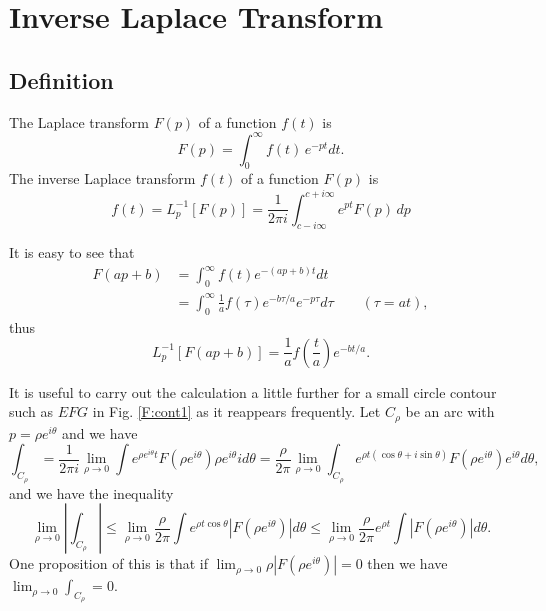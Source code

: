 
\chapter{Inverse Laplace Transform}

\section{Definition}
The Laplace transform $F(p)$ of a function $f(t)$ is
\begin{equation}
  F(p) = \int_0^{\infty} f(t)\, e^{-pt} dt.
\end{equation}
The inverse Laplace transform $f(t)$ of a function $F(p)$ is
\begin{equation}
	f(t) = L_p^{-1} [ F(p) ] 
       = \frac{1}{2\pi i}   
           \int_{c-i\infty}^{c+i\infty} e^{p t} F(p)\, dp
\end{equation}

It is easy to see that
\begin{align*}
	F(a p+b) 
	&= \int_0^{\infty} f(t) e^{-(a p+b)t} dt  \\
	&= \int_0^{\infty} \frac{1}{a} f\left(\tau\right) e^{-b\tau /a} 
	     e^{-p\tau} d\tau  \qquad (\tau=a t),
\end{align*}
thus
\begin{equation} \label{E:ilt_lin}
	L_p^{-1} [ F(a p + b) ] = \frac{1}{a} f(\frac{t}{a}) e^{-b t/a}.
\end{equation}

It is useful to carry out the calculation a little further for a small circle
contour such as $EFG$ in Fig. \ref{F:cont1} as it reappears frequently. Let
$C_{\rho}$ be an arc with $p=\rho e^{i\theta}$ and we have
\[
  \int_{C_{\rho}}  
    = \frac{1}{2\pi i} \lim_{\rho\to 0} 
      \int e^{\rho e^{i\theta} t} F(\rho e^{i\theta})
        \rho e^{i\theta} i d\theta
    = \frac{\rho}{2\pi} \lim_{\rho\to 0} 
      \int_{C_{\rho}} e^{\rho t (\cos\theta+i\sin\theta)} F(\rho e^{i\theta})
         e^{i\theta} d\theta,
\]
and we have the inequality
\begin{equation}
  \lim_{\rho\to 0} \left| \int_{C_{\rho}} \right| 
    \le \lim_{\rho\to 0} \frac{\rho}{2\pi} 
      \int e^{\rho t \cos\theta} \left| F(\rho e^{i\theta}) \right| d\theta
    \le \lim_{\rho\to 0} \frac{\rho}{2\pi} e^{\rho t} 
        \int \left| F(\rho e^{i\theta}) \right| d\theta.
\end{equation}
One proposition of this is that if 
$\lim_{\rho\to 0} \rho |F(\rho e^{i\theta})|=0$ then we have 
$\lim_{\rho\to 0} \int_{C_{\rho}} =0$.



